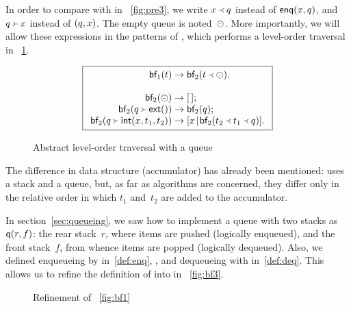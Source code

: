 In order to compare with
 in
\fig~\vref{fig:pre3}, we write
\(\enq{x}{q}\) instead of
\(\fun{enq}(x,q)\), and
\(\deq{x}{q}\) instead of \(\pair{q}{x}\). The
empty queue is noted~\(\emq\). More importantly,
we will allow these expressions in the patterns of
, which performs a
level\hyp{}order traversal in \fig~\ref{fig:bf1}.
\begin{figure}
\begin{equation*}
\boxed{
\begin{array}{r@{\;}c@{\;}l}
\fun{bf}_1(t) & \rightarrow & \fun{bf}_2(\enq{t}{\emq}).\\
\\
\fun{bf}_2(\emq) & \rightarrow & \el;\\
\fun{bf}_2(\deq{\fun{ext}()}{q}) & \rightarrow & \fun{bf}_2(q);\\
\fun{bf}_2(\deq{\fun{int}(x,t_1,t_2)}{q})
  & \rightarrow & \cons{x}{\fun{bf}_2(\enq{t_2}{\enq{t_1}{q}})}.
\end{array}}
\end{equation*}
\caption{Abstract level-order traversal with a queue}
\label{fig:bf1}
\end{figure}
The difference in data structure (accumulator) has already been
mentioned:  uses a
stack and  a queue, but,
as far as algorithms are concerned, they differ only in the relative
order in which \(t_1\) and~\(t_2\) are added to the accumulator.

In section~\ref{sec:queueing}, we saw how to implement a queue with
two stacks as \(\fun{q}(r,f)\): the rear
stack~\(r\), where items are pushed (logically enqueued), and the
front stack~\(f\), from whence items are popped (logically
dequeued). Also, we defined enqueueing by
 in~\eqref{def:enq},
, and dequeueing with
 in~\eqref{def:deq}. This allows us
to refine the definition of
 into
 in \fig~\vref{fig:bf3}.
\begin{figure}
\centering
{}
\caption{Refinement of \fig~\vref{fig:bf1}}
\label{fig:bf3}
\end{figure}

